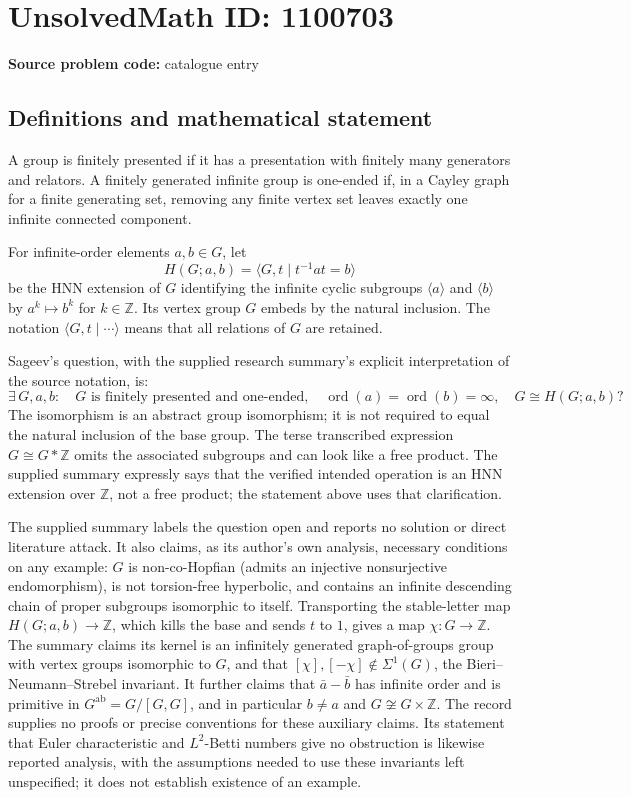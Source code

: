 \documentclass[11pt]{article}
\newcommand{\Z}{\mathbb{Z}}
\begin{document}
\section*{UnsolvedMath ID: 1100703}
\textbf{Source problem code:} catalogue entry
\subsection{Definitions and mathematical statement}
A group is finitely presented if it has a presentation with finitely many generators and relators. A finitely generated infinite group is one-ended if, in a Cayley graph for a finite generating set, removing any finite vertex set leaves exactly one infinite connected component.

For infinite-order elements $a,b\in G$, let
\[
H(G;a,b)=\langle G,t\mid t^{-1}at=b\rangle
\]
be the HNN extension of $G$ identifying the infinite cyclic subgroups $\langle a\rangle$ and $\langle b\rangle$ by $a^k\mapsto b^k$ for $k\in\Z$. Its vertex group $G$ embeds by the natural inclusion. The notation $\langle G,t\mid\cdots\rangle$ means that all relations of $G$ are retained.

Sageev's question, with the supplied research summary's explicit interpretation of the source notation, is:
\[
\exists\,G,a,b:\quad G\text{ is finitely presented and one-ended},\quad
\operatorname{ord}(a)=\operatorname{ord}(b)=\infty,\quad
G\cong H(G;a,b)?
\]
The isomorphism is an abstract group isomorphism; it is not required to equal the natural inclusion of the base group. The terse transcribed expression $G\cong G\ast\Z$ omits the associated subgroups and can look like a free product. The supplied summary expressly says that the verified intended operation is an HNN extension over $\Z$, not a free product; the statement above uses that clarification.

The supplied summary labels the question open and reports no solution or direct literature attack. It also claims, as its author's own analysis, necessary conditions on any example: $G$ is non-co-Hopfian (admits an injective nonsurjective endomorphism), is not torsion-free hyperbolic, and contains an infinite descending chain of proper subgroups isomorphic to itself. Transporting the stable-letter map $H(G;a,b)\to\Z$, which kills the base and sends $t$ to $1$, gives a map $\chi:G\to\Z$. The summary claims its kernel is an infinitely generated graph-of-groups group with vertex groups isomorphic to $G$, and that $[\chi],[-\chi]\notin\Sigma^1(G)$, the Bieri--Neumann--Strebel invariant. It further claims that $\bar a-\bar b$ has infinite order and is primitive in $G^{\mathrm{ab}}=G/[G,G]$, and in particular $b\ne a$ and $G\not\cong G\times\Z$. The record supplies no proofs or precise conventions for these auxiliary claims. Its statement that Euler characteristic and $L^2$-Betti numbers give no obstruction is likewise reported analysis, with the assumptions needed to use these invariants left unspecified; it does not establish existence of an example.
\end{document}
